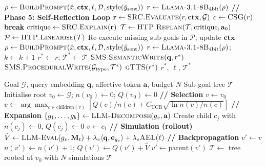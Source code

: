 \documentclass[10pt,conference]{IEEEtran}
\theoremstyle{ieeethm}
\theoremstyle{ieeedef}
\theoremstyle{ieeeremark}
\begin{document}
\begin{algorithm}[!t]
\begin{algorithmic}[1]
\State $\rho \gets \textsc{BuildPrompt}(\hat{x}, \mathbf{ctx}, \ell, \mathcal{D}, \text{style}(\hat{y}_\text{sent}))$
\State $r \gets \textsc{Llama\text{-}3.1\text{-}8B}_\text{4bit}(\rho)$
\Statex \textbf{// Phase 5: Self-Reflection Loop}
  \State $\mathbf{r} \gets \textsc{SRC.Evaluate}(r, \mathbf{ctx}, \mathcal{G})$ 
  \State $c \gets \textsc{CSG}(r)$ 
    \State \textbf{break}
  \EndIf
  \State $\text{critique} \gets \textsc{SRC.Explain}(\mathbf{r})$
  \State $\mathcal{T} \gets \textsc{HTP.Replan}(\mathcal{T}, \text{critique}, \mathbf{a}_0)$
  \State $\mathcal{P} \gets \textsc{HTP.Linearise}(\mathcal{T})$
  \State Re-execute missing sub-goals in $\mathcal{P}$; update $\mathbf{ctx}$
  \State $\rho \gets \textsc{BuildPrompt}(\hat{x}, \mathbf{ctx}, \ell, \mathcal{D}, \text{style}(\hat{y}_\text{sent}))$
  \State $r \gets \textsc{Llama\text{-}3.1\text{-}8B}_\text{4bit}(\rho)$;\; $k \gets k + 1$
\EndWhile
\State $r^* \gets r$;\; $\mathcal{T}^* \gets \mathcal{T}$
\State $\textsc{SMS.SemanticWrite}(\mathbf{q}, r^*)$
\State $\textsc{SMS.ProceduralWrite}(\mathcal{G}_\text{type}, \mathcal{T}^*)$
\State $\textsc{gTTS}(r^*)$ 
\State \Return $r^*$, $\ell$, $\mathcal{T}^*$
\end{algorithmic}
\end{algorithm}

\begin{algorithm}[!t]
\caption{HTP: MCTS-Guided Sub-Goal Planning}
\label{alg:htp}
\begin{algorithmic}[1]
\small
\Require Goal $\mathcal{G}$, query embedding $\mathbf{q}$, affective token $\mathbf{a}$, budget $N$
\Ensure Sub-goal tree $\mathcal{T}$
\State Initialise root $v_0 \leftarrow \mathcal{G}$;\; $n(v_0) \leftarrow 0$;\; $Q(v_0) \leftarrow 0$
  \Statex \textbf{// Selection}
  \State $v \leftarrow v_0$
    \State $v \leftarrow \arg\max_{c \in \text{children}(v)}\!\left[Q(c)/n(c) + C_\text{UCB}\sqrt{\ln n(v)/n(c)}\right]$
  \EndWhile
  \Statex \textbf{// Expansion}
    \State $\{g_1, \ldots, g_b\} \leftarrow \textsc{LLM-Decompose}(g_v, \mathbf{a})$
      \State Create child $c_j$ with $n(c_j) \leftarrow 0$, $Q(c_j) \leftarrow 0$
    \EndFor
    \State $v \leftarrow c_1$
  \EndIf
  \Statex \textbf{// Simulation (rollout)}
  \State $\hat{V} \leftarrow \textsc{LLM-Eval}(g_v, \mathbf{M}_t) + \lambda_v\langle\mathbf{q}, \mathbf{e}_{g_v}\rangle + \lambda_e \textsc{AEL}(\ell)$
  \Statex \textbf{// Backpropagation}
  \State $v' \leftarrow v$
    \State $n(v') \leftarrow n(v') + 1$;\; $Q(v') \leftarrow Q(v') + \hat{V}$
    \State $v' \leftarrow \text{parent}(v')$
  \EndWhile
\EndFor
\State $\mathcal{T} \leftarrow$ tree rooted at $v_0$ with $N$ simulations
\State \Return $\mathcal{T}$
\end{algorithmic}
\end{algorithm}
\end{document}
